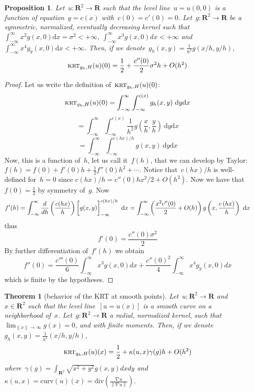 \documentclass[12pt]{article}                  %
\newtheorem{theorem}{Theorem}
\newtheorem{proposition}{Proposition}
\begin{document}
\begin{proposition}
	Let~$u:\mathbf{R}^2\to\mathbf{R}$ such that the level
	line~$u=u(0,0)$ is a function of
	equation~$y=c(x)$ with~$c(0)=c'(0)=0$.
	Let~$g:\mathbf{R}^2\to\mathbf{R}$ be a symmetric, normalized,
	eventually decreasing kernel such that~$\int_{-\infty}^\infty x^2g(x,0)\mathrm{d}
	x=\sigma^2<+\infty$, $\int_{-\infty}^\infty x^3g(x,0)dx<+\infty$ and~$\int_{-\infty}^\infty x^4g_y(x,0)\mathrm{d}
	x<+\infty$.  Then, if we
	denote~$g_h(x,y)=\frac1{h^2}g(x/h,y/h)$,
	\[
		\textsc{krt}_{g_h,H}(u)(0)=\frac12+\frac{c''(0)}2\sigma^2h+O(h^2)
	\]
\end{proposition}

\begin{proof}
	Let us write the definition of~$\textsc{krt}_{g_h,H}(u)(0)$:
	\[
		\textsc{krt}_{g_h,H}(u)(0)=
		\int_{-\infty}^\infty\int_{-\infty}^{c(x)}
		g_h(x,y)\ %
		\mathrm{d}y
		\mathrm{d}x
	\]
	\[
		=
		\int_{-\infty}^\infty\int_{-\infty}^{c(x)}
		\frac1{h^2}g\left(\frac{x}{h},\frac{y}{h}\right)\ %
		\mathrm{d}y
		\mathrm{d}x
	\]
	\[
		=
		\int_{-\infty}^\infty\int_{-\infty}^{c\left(hx\right)/h}
		g\left(x,y\right)\ %
		\mathrm{d}y
		\mathrm{d}x
	\]
	Now, this is a function of~$h$, let us call it~$f(h)$, that we can
	develop by Taylor:~$f(h)=f(0)+f'(0)h+\frac12f''(0)h^2+\cdots$.
	Notice that~$c(hx)/h$ is well-defined for~$h=0$ since
	$c(hx)/h=c''(0)hx^2/2+O(h^2)$.
	Now we have that~$f(0)=\frac12$ by symmetry of~$g$.  Now
	\[
		f'(h)=
		\int_{-\infty}^\infty \frac{d}{d h}\left(\frac{c(hx)}h\right)
		\left[\vphantom{\int}g(x,y)\right]_{-\infty}^{c(hx)/h}
		\ \mathrm{d}x
		=
		\int_{-\infty}^\infty \left(\frac{x^2c''(0)}2+O(h)\right)
		g\left(x,\frac{c\left(hx\right)}h\right)
		\ \mathrm{d}x
	\]
	thus
	\[
		f'(0)=\frac{c''(0)\sigma^2}2
	\]
	By further differentiation of~$f'(h)$ we obtain
	\[
		f''(0)=
		\frac{c'''(0)}6\int_{-\infty}^\infty x^3g(x,0)dx
		+
		\frac{c''(0)^2}4\int_{-\infty}^\infty x^4g_y(x,0)dx
	\]
	which is finite by the hypotheses.
\end{proof}


\begin{theorem}[behavior of the KRT at smooth points]
	Let~$u:\mathbf{R}^2\to\mathbf{R}$ and~$x\in\mathbf{R}^2$ such that
	the level line~$[u=u(x)]$ is a smooth curve on a neighborhood
	of~$x$.  Let~$g:\mathbf{R}^2\to\mathbf{R}$ a radial,
	normalized kernel, such that~$\lim_{\|x\|\to\infty}g(x)=0$, and with
	finite moments.  Then, if we
	denote~$g_h(x,y)=\frac{1}{h^2}(x/h,y/h)$,
	\[
		\textsc{krt}_{g_h,H}(u)(x)=\frac12+\kappa(u,x)\gamma(g)h+O(h^2)
	\]
	where~$\gamma(g)=\int_{\mathbf{R}^2}\sqrt{x^2+y^2}g(x,y)dxdy$ and
	$\kappa(u,x)=\mathrm{curv}(u)(x)=\mathrm{div}\left(\frac{\nabla
	u}{\left\|\nabla u\right\|}\right)$.
\end{theorem}
\end{document}
